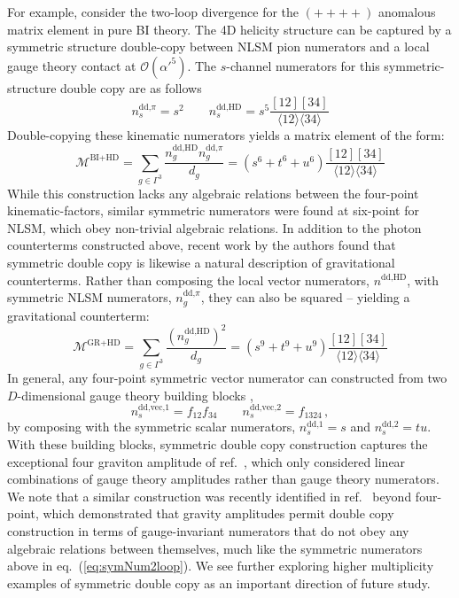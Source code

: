 \documentclass[11pt,letter]{article}
\def\eqn#1{eq.~(\ref{#1})}
\begin{document}
For example, consider the two-loop divergence for the $(++++)$ anomalous matrix element in pure BI theory. The 4D helicity structure can be captured by a symmetric structure double-copy between NLSM pion numerators and a local gauge theory contact at $\mathcal{O}(\alpha'^5)$. The $s$-channel numerators for this symmetric-structure double copy are as follows
\begin{equation}\label{eq:symNum2loop}
n_s^{\text{dd,}\pi} = s^2 \qquad n_s^{\text{dd,HD}} = s^5 \frac{[12][34]}{\langle 12\rangle \langle 34\rangle}
\end{equation}
Double-copying these kinematic numerators yields a matrix element of the form:
\begin{equation} \label{eq:2loopCTsymDC}
\mathcal{M}^{\text{BI}+\text{HD}} = \sum_{g\in \Gamma^3} \frac{n_g^{\text{dd,HD}}n^{\text{dd,}\pi}_g}{d_g} = (s^6+t^6+u^6) \frac{[12][34]}{\langle 12\rangle \langle 34\rangle}
\end{equation}
While this construction lacks any algebraic relations between the four-point kinematic-factors, similar symmetric numerators were found at six-point for NLSM, which obey non-trivial algebraic relations. In addition to the photon counterterms constructed above, recent work by the authors \cite{Carrasco:2022jxn} found that symmetric double copy is likewise a natural description of gravitational counterterms. Rather than composing the local vector numerators, $n^{\text{dd,HD}}$, with symmetric NLSM numerators, $n^{\text{dd,}\pi}_g$, they can also be squared -- yielding a gravitational counterterm:
\begin{equation} \label{eq:2loopCTsymDC}
\mathcal{M}^{\text{GR}+\text{HD}} = \sum_{g\in \Gamma^3} \frac{(n^{\text{dd,HD}}_g)^2}{d_g} = (s^9+t^9+u^9)  \frac{[12][34]}{\langle 12\rangle \langle 34\rangle}
\end{equation}
In general, any four-point symmetric vector numerator can constructed from two $D$-dimensional gauge theory building blocks \cite{Carrasco:2022jxn},
\begin{equation}
n_s^{\text{dd,vec,1}} = f_{12}f_{34} \qquad n_s^{\text{dd,vec,2}} = f_{1324}\,,
\end{equation}
by composing with the symmetric scalar numerators, $n_s^{\text{dd,1}} = s$ and  $n_s^{\text{dd,2}} = tu$. With these building blocks, symmetric double copy construction captures the exceptional four graviton amplitude of ref.~\cite{Boels:2016xhc}, which only considered linear combinations of gauge theory amplitudes rather than gauge theory numerators. We note that a similar construction was recently identified in ref.~\cite{Bourjaily:2023tcc} beyond four-point, which demonstrated that gravity amplitudes permit double copy construction in terms of gauge-invariant numerators that do not obey any algebraic relations between themselves, much like the symmetric numerators above in \eqn{eq:symNum2loop}. We see further exploring higher multiplicity examples of symmetric double copy as an important direction of future study. 
\end{document}
